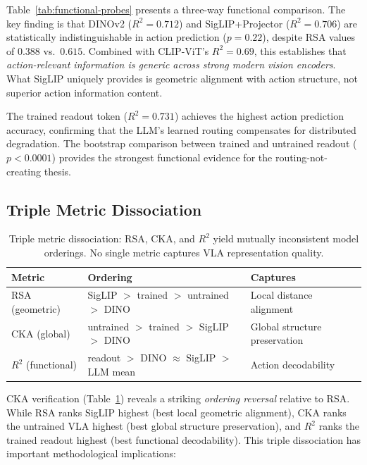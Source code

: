 \documentclass[letterpaper]{article}
\begin{document}
Table~\ref{tab:functional-probes} presents a three-way functional comparison. The key finding is that DINOv2 ($R^2{=}0.712$) and SigLIP+Projector ($R^2{=}0.706$) are statistically indistinguishable in action prediction ($p{=}0.22$), despite RSA values of $0.388$ vs.\ $0.615$. Combined with CLIP-ViT's $R^2{=}0.69$, this establishes that \emph{action-relevant information is generic across strong modern vision encoders}. What SigLIP uniquely provides is geometric alignment with action structure, not superior action information content.

The trained readout token ($R^2{=}0.731$) achieves the highest action prediction accuracy, confirming that the LLM's learned routing compensates for distributed degradation. The bootstrap comparison between trained and untrained readout ($p{<}0.0001$) provides the strongest functional evidence for the routing-not-creating thesis.

\subsection{Triple Metric Dissociation}
\label{sec:exp-dissociation}

\begin{table}[t]
\centering
\caption{Triple metric dissociation: RSA, CKA, and $R^2$ yield mutually inconsistent model orderings. No single metric captures VLA representation quality.}
\label{tab:triple-dissociation}
\begin{tabular}{lll}
\toprule
\textbf{Metric} & \textbf{Ordering} & \textbf{Captures} \\
\midrule
RSA (geometric) & SigLIP $>$ trained $>$ untrained $>$ DINO & Local distance alignment \\
CKA (global) & untrained $>$ trained $>$ SigLIP $>$ DINO & Global structure preservation \\
$R^2$ (functional) & readout $>$ DINO $\approx$ SigLIP $>$ LLM mean & Action decodability \\
\bottomrule
\end{tabular}
\end{table}

CKA verification (Table~\ref{tab:triple-dissociation}) reveals a striking \emph{ordering reversal} relative to RSA. While RSA ranks SigLIP highest (best local geometric alignment), CKA ranks the untrained VLA highest (best global structure preservation), and $R^2$ ranks the trained readout highest (best functional decodability). This triple dissociation has important methodological implications:
\end{document}

